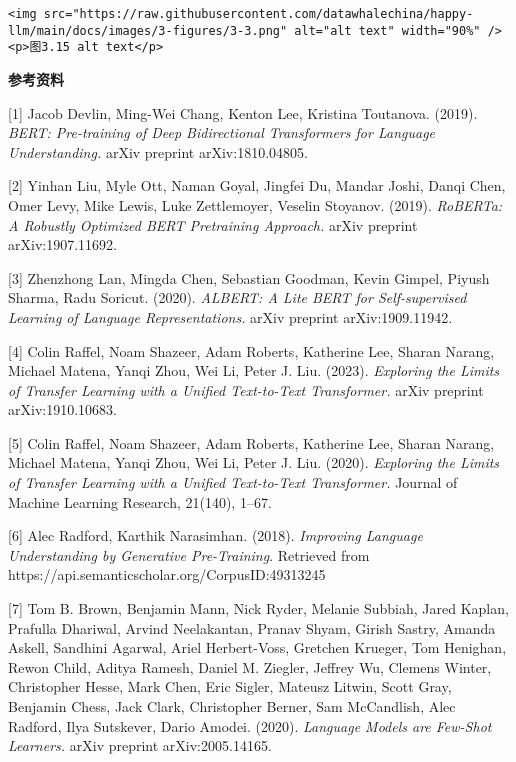 \documentclass[
]{article}
\begin{document}
\begin{verbatim}
<img src="https://raw.githubusercontent.com/datawhalechina/happy-llm/main/docs/images/3-figures/3-3.png" alt="alt text" width="90%" />
<p>图3.15 alt text</p>
\end{verbatim}

\textbf{参考资料}

{[}1{]} Jacob Devlin, Ming-Wei Chang, Kenton Lee, Kristina Toutanova.
(2019). \emph{BERT: Pre-training of Deep Bidirectional Transformers for
Language Understanding.} arXiv preprint arXiv:1810.04805.

{[}2{]} Yinhan Liu, Myle Ott, Naman Goyal, Jingfei Du, Mandar Joshi,
Danqi Chen, Omer Levy, Mike Lewis, Luke Zettlemoyer, Veselin Stoyanov.
(2019). \emph{RoBERTa: A Robustly Optimized BERT Pretraining Approach.}
arXiv preprint arXiv:1907.11692.

{[}3{]} Zhenzhong Lan, Mingda Chen, Sebastian Goodman, Kevin Gimpel,
Piyush Sharma, Radu Soricut. (2020). \emph{ALBERT: A Lite BERT for
Self-supervised Learning of Language Representations.} arXiv preprint
arXiv:1909.11942.

{[}4{]} Colin Raffel, Noam Shazeer, Adam Roberts, Katherine Lee, Sharan
Narang, Michael Matena, Yanqi Zhou, Wei Li, Peter J. Liu. (2023).
\emph{Exploring the Limits of Transfer Learning with a Unified
Text-to-Text Transformer.} arXiv preprint arXiv:1910.10683.

{[}5{]} Colin Raffel, Noam Shazeer, Adam Roberts, Katherine Lee, Sharan
Narang, Michael Matena, Yanqi Zhou, Wei Li, Peter J. Liu. (2020).
\emph{Exploring the Limits of Transfer Learning with a Unified
Text-to-Text Transformer.} Journal of Machine Learning Research,
21(140), 1--67.

{[}6{]} Alec Radford, Karthik Narasimhan. (2018). \emph{Improving
Language Understanding by Generative Pre-Training}. Retrieved from
https://api.semanticscholar.org/CorpusID:49313245

{[}7{]} Tom B. Brown, Benjamin Mann, Nick Ryder, Melanie Subbiah, Jared
Kaplan, Prafulla Dhariwal, Arvind Neelakantan, Pranav Shyam, Girish
Sastry, Amanda Askell, Sandhini Agarwal, Ariel Herbert-Voss, Gretchen
Krueger, Tom Henighan, Rewon Child, Aditya Ramesh, Daniel M. Ziegler,
Jeffrey Wu, Clemens Winter, Christopher Hesse, Mark Chen, Eric Sigler,
Mateusz Litwin, Scott Gray, Benjamin Chess, Jack Clark, Christopher
Berner, Sam McCandlish, Alec Radford, Ilya Sutskever, Dario Amodei.
(2020). \emph{Language Models are Few-Shot Learners.} arXiv preprint
arXiv:2005.14165.
\end{document}
